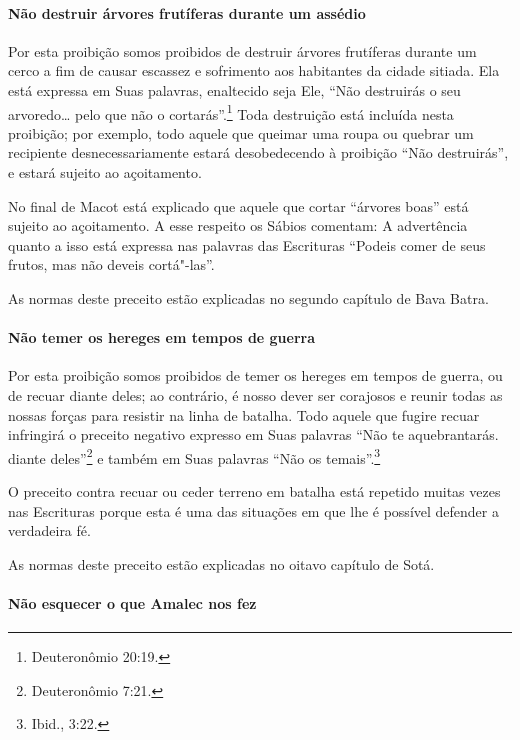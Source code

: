 \begin{multicols}{2}
\paragraph{Não destruir árvores frutíferas durante um assédio}

Por esta proibição somos proibidos de destruir árvores frutíferas
durante um cerco a fim de causar escassez e sofrimento aos habitantes da
cidade sitiada. Ela está expressa em Suas palavras, enaltecido seja Ele,
``Não destruirás o seu arvoredo\ldots{} pelo que não o cortarás''.\footnote{Deuteronômio 20:19.} Toda
destruição está incluída nesta proibição; por exemplo, todo aquele que
queimar uma roupa ou quebrar um recipiente desnecessariamente estará
desobedecendo à proibição ``Não destruirás'', e estará sujeito ao
açoitamento.

No final de Macot\starr{} está explicado que aquele que cortar ``árvores boas''
está sujeito ao açoitamento. A esse respeito os Sábios comentam: A
advertência quanto a isso está expressa nas palavras das Escrituras
``Podeis comer de seus frutos, mas não deveis cortá"-las''.

As normas deste preceito estão explicadas no segundo capítulo de Bava
Batra\starr.

\paragraph{Não temer os hereges em tempos de guerra}

Por esta proibição somos proibidos de temer os hereges em tempos de
guerra, ou de recuar diante deles; ao contrário, é nosso dever ser
corajosos e reunir todas as nossas forças para resistir na linha de
batalha. Todo aquele que fugire recuar infringirá o preceito negativo
expresso em Suas palavras ``Não te aquebrantarás. diante deles''\footnote{Deuteronômio 7:21.} e também em Suas palavras ``Não os temais''.\footnote{Ibid.,
3:22.}

O preceito contra recuar ou ceder terreno em batalha está repetido
muitas vezes nas Escrituras porque esta é uma das situações em que lhe é
possível defender a verdadeira fé.

As normas deste preceito estão explicadas no oitavo capítulo de Sotá\starr.

\paragraph{Não esquecer o que Amalec\starr{} nos fez}


\end{multicols}
